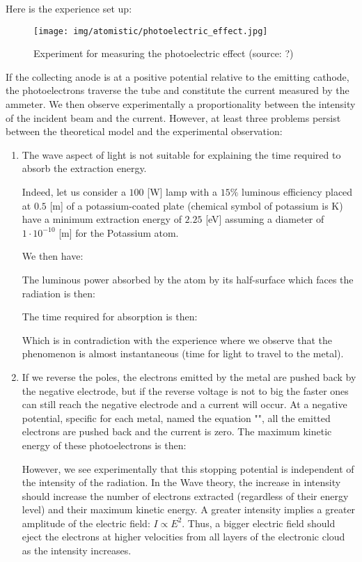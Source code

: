 	Here is the experience set up:
	\begin{figure}[H]
		\centering
		\texttt{[image: img/atomistic/photoelectric\_effect.jpg]}
		\caption[Experiment for measuring the photoelectric effect]{Experiment for measuring the photoelectric effect (source: ?)}
	\end{figure}
	If the collecting anode is at a positive potential relative to the emitting cathode, the photoelectrons traverse the tube and constitute the current measured by the ammeter. We then observe experimentally a proportionality between the intensity of the incident beam and the current.
	However, at least three problems persist between the theoretical model and the experimental observation:
	\begin{enumerate}
		\item The wave aspect of light is not suitable for explaining the time required to absorb the extraction energy.

		Indeed, let us consider a $100$ [W] lamp with a $15\%$ luminous efficiency placed at $0.5$ [m] of a potassium-coated plate (chemical symbol of potassium is $\mathrm{K}$) have a minimum extraction energy of $2.25$ [eV] assuming a diameter of $1\cdot 10^{-10}$ [m] for the Potassium atom.
		
		We then have:
		
		The luminous power absorbed by the atom by its half-surface which faces the radiation is then:
		
		The time required for absorption is then:
		
		Which is in contradiction with the experience where we observe that the phenomenon is almost instantaneous (time for light to travel to the metal).
		
		\item If we reverse the poles, the electrons emitted by the metal are pushed back by the negative electrode, but if the reverse voltage is not to big the faster ones can still reach the negative electrode and a current will occur. At a negative potential, specific for each metal, named the equation "", all the emitted electrons are pushed back and the current is zero. The maximum kinetic energy of these photoelectrons is then:
		
		However, we see experimentally that this stopping potential is independent of the intensity of the radiation. In the Wave theory, the increase in intensity should increase the number of electrons extracted (regardless of their energy level) and their maximum kinetic energy. A greater intensity implies a greater amplitude of the electric field: $I \propto E^2$. Thus, a bigger electric field should eject the electrons at higher velocities from all layers of the electronic cloud as the intensity increases.
		

\end{enumerate}

